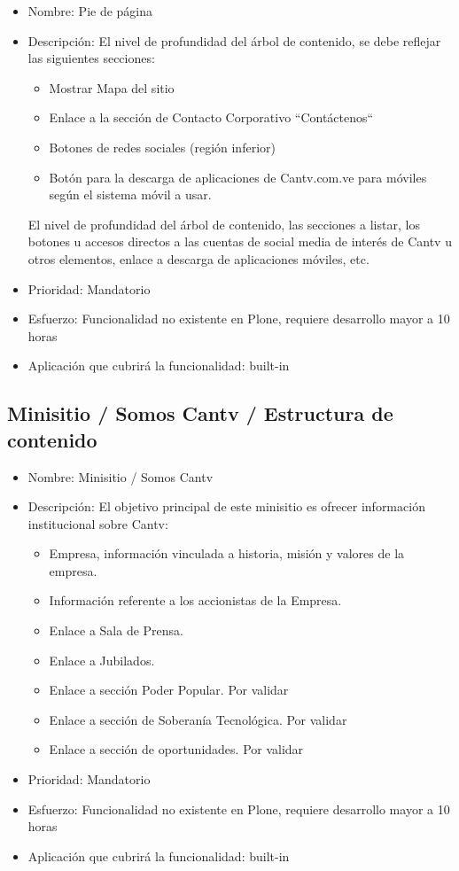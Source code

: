 \documentclass[11pt, letterpaper, oneside, spanish]{scrbook}
\begin{document}
\begin{itemize}
\item Nombre: Pie de página
\item Descripción: El nivel de profundidad del árbol de contenido, se debe
  reflejar las siguientes secciones:
\begin{itemize}
\item Mostrar Mapa del sitio
\item Enlace a la sección de Contacto Corporativo “Contáctenos“
\item Botones de redes sociales (región inferior)
\item Botón para la descarga de aplicaciones de Cantv.com.ve para móviles según
    el sistema móvil a usar.
\end{itemize}
El nivel de profundidad del árbol de contenido, las secciones a listar, los
  botones u accesos directos a las cuentas de social media de interés de Cantv
  u otros elementos, enlace a descarga de aplicaciones móviles, etc.
\item Prioridad: Mandatorio
\item Esfuerzo: Funcionalidad no existente en Plone, requiere desarrollo mayor a 10 horas
\item Aplicación que cubrirá la funcionalidad:  built-in
\end{itemize}
\subsection{Minisitio / Somos Cantv / Estructura de contenido}
\label{sec-2-1-30}

\begin{itemize}
\item Nombre: Minisitio / Somos Cantv
\item Descripción: El objetivo principal de este minisitio es ofrecer información
  institucional sobre Cantv:
\begin{itemize}
\item Empresa, información vinculada a historia, misión y valores de la empresa.
\item Información referente a los accionistas de la Empresa.
\item Enlace a Sala de Prensa.
\item Enlace a Jubilados.
\item Enlace a sección Poder Popular. Por validar
\item Enlace a sección de Soberanía Tecnológica. Por validar
\item Enlace a sección de oportunidades. Por validar
\end{itemize}
\item Prioridad: Mandatorio
\item Esfuerzo: Funcionalidad no existente en Plone, requiere desarrollo mayor a 10 horas
\item Aplicación que cubrirá la funcionalidad:  built-in
\end{itemize}
\end{document}
